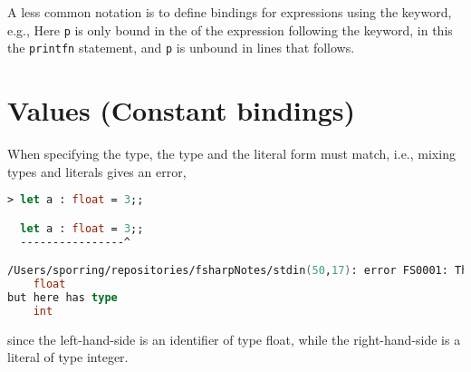 A less common notation is to define bindings for expressions using the  keyword, e.g.,
%
%
Here \lstinline|p| is only bound in the  of the expression following the  keyword, in this the \lstinline|printfn| statement, and \lstinline|p| is unbound in lines that follows.
\begin{comment}
  Here the use of indentation to define a sequence of expressions
  \fs{numbersInWIndentation}{The identifier \lstinline!p! is only bound in the nested scope following the keyword \keyword{in}.}
\end{comment}


\section{Values (Constant bindings)}
When specifying the type, the type and the literal form must match, i.e., mixing types and literals gives an error,
%
\begin{lstlisting}[language=fsharp,caption={fsharpi, binding error due to type mismatch.}]
  > let a : float = 3;;

  let a : float = 3;;
  ----------------^

/Users/sporring/repositories/fsharpNotes/stdin(50,17): error FS0001: This expression was expected to have type
    float    
but here has type
    int    
\end{lstlisting}
since the left-hand-side is an identifier of type float, while the right-hand-side is a literal of type integer.

